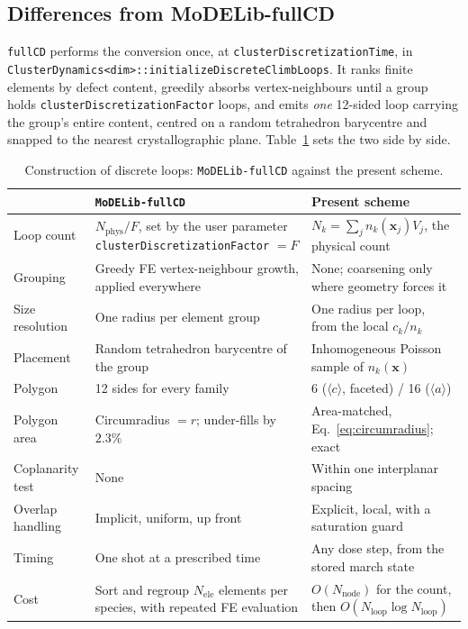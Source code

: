 \documentclass[11pt,a4paper]{article}
\newcommand{\code}[1]{\texttt{\small #1}}
\newcommand{\aloop}{\ensuremath{\langle a\rangle}}
\newcommand{\cloop}{\ensuremath{\langle c\rangle}}
\begin{document}
\subsection{Differences from MoDELib-fullCD}

\code{fullCD} performs the conversion once, at \code{clusterDiscretizationTime},
in \code{ClusterDynamics<dim>::initializeDiscreteClimbLoops}. It ranks finite
elements by defect content, greedily absorbs vertex-neighbours until a group
holds \code{clusterDiscretizationFactor} loops, and emits \emph{one} 12-sided
loop carrying the group's entire content, centred on a random tetrahedron
barycentre and snapped to the nearest crystallographic plane.
Table~\ref{tab:fullcd-diff} sets the two side by side.

\begin{table}[htb]
\centering
\caption{Construction of discrete loops: \code{MoDELib-fullCD} against the
present scheme.}
\label{tab:fullcd-diff}
\small
\begin{tabular}{p{3.1cm}p{5.4cm}p{6.2cm}}
\toprule
 & \code{MoDELib-fullCD} & Present scheme \\
\midrule
Loop count &
$N_{\text{phys}}/F$, set by the user parameter
\code{clusterDiscretizationFactor} $=F$ &
$N_k=\sum_j n_k(\mathbf{x}_j)V_j$, the physical count \\
Grouping &
Greedy FE vertex-neighbour growth, applied everywhere &
None; coarsening only where geometry forces it \\
Size resolution &
One radius per element group &
One radius per loop, from the local $c_k/n_k$ \\
Placement &
Random tetrahedron barycentre of the group &
Inhomogeneous Poisson sample of $n_k(\mathbf{x})$ \\
Polygon &
12 sides for every family &
6 (\cloop, faceted) / 16 (\aloop) \\
Polygon area &
Circumradius $=r$; under-fills by $2.3\%$ &
Area-matched, Eq.~\eqref{eq:circumradius}; exact \\
Coplanarity test &
None &
Within one interplanar spacing \\
Overlap handling &
Implicit, uniform, up front &
Explicit, local, with a saturation guard \\
Timing &
One shot at a prescribed time &
Any dose step, from the stored march state \\
Cost &
Sort and regroup $N_{\text{ele}}$ elements per species, with repeated FE
evaluation &
$O(N_{\text{node}})$ for the count, then
$O(N_{\text{loop}}\log N_{\text{loop}})$ \\
\bottomrule
\end{tabular}
\end{table}
\end{document}
